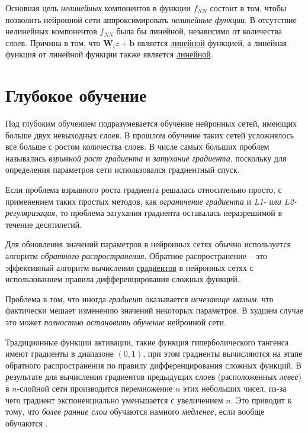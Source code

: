 \documentclass[%
	11pt,
	a4paper,
	utf8,
		]{article}
\begin{document}
Основная цель \emph{нелинейных} компонентов в функции $ f_{NN} $ состоит в том, чтобы позволить нейронной сети аппроксимировать \emph{нелинейные функции}. В отсутствие нелинейных компонентов $ f_{NN} $ была бы линейной, независимо от количества слоев. Причина в том, что $ \mathbf{W}_l z + \mathbf{b} $ является \underline{линейной} функцией, а линейная функция от линейной функции также является \underline{линейной}.

\section{Глубокое обучение}

Под глубоким обучением подразумевается обучение нейронных сетей, имеющих больше двух невыходных слоев. В прошлом обучение таких сетей усложнялось все больше с ростом количества слоев. В числе самых больших проблем назывались \emph{взрывной рост градиента} и \emph{затухание градиента}, поскольку для определения параметров сети использовался градиентный спуск.

Если проблема взрывного роста градиента решалась относительно просто, с применением таких простых методов, как \emph{ограничение градиента} и \emph{L1- или L2-регуляризация}, то проблема затухания градиента оставалась неразрешимой в течение десятилетий.

Для обновления значений параметров в нейронных сетях обычно используется алгоритм \emph{обратного распространения}. Обратное распространение -- это эффективный алгоритм вычисления \underline{градиентов} в нейронных сетях с использованием правила дифференцирования сложных функций.


Проблема в том, что иногда \emph{градиент} оказывается \emph{исчезающе малым}, что фактически мешает изменению значений некоторых параметров. В худшем случае это может \emph{полностью остановить обучение} нейронной сети.

Традиционные функции активации, такие функция гиперболического тангенса имеют градиенты в диапазоне $ (0, 1) $, при этом градиенты вычисляются на этапе обратного распространения по правилу дифференцирования сложных функций. В результате для вычисления градиентов предыдущих слоев (расположенных \emph{левее}) в $ n $-слойной сети производится перемножение $ n $ этих небольших чисел, из-за чего градиент экспоненциально уменьшается с увеличением $ n $. Это приводит к тому, что \emph{более ранние слои} обучаются намного \emph{медленее}, если вообще обучаются \cite[]{burkov:2020}.
\end{document}
